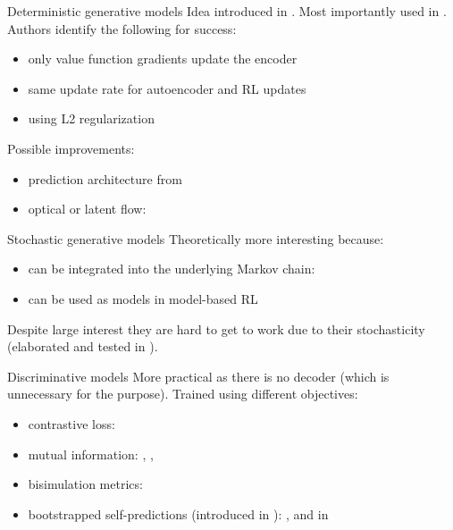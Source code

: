 \documentclass{beamer}
\begin{document}
\begin{frame}{Deterministic generative models}
	Idea introduced in \cite{lange2010deep}.
	Most importantly used in \cite{sac+ae}.
	Authors identify the following for success:
	\begin{itemize}
			\item only value function gradients update the encoder
			\item same update rate for autoencoder and RL updates
			\item using L2 regularization
	\end{itemize}
	Possible improvements:
	\begin{itemize}
			\item prediction architecture from \cite{oh2015action}
			\item optical or latent flow: \cite{flow}
	\end{itemize}
\end{frame}


\begin{frame}{Stochastic generative models}
		Theoretically more interesting because:
		\begin{itemize}
				\item can be integrated into the underlying Markov chain: \cite{slac}
				\item can be used as models in model-based RL
		\end{itemize}
		Despite large interest they are hard to get to work due to 
		their stochasticity (elaborated and tested in \cite{sac+ae}).
\end{frame}


\begin{frame}{Discriminative models}
		More practical as there is no decoder (which is unnecessary for the purpose).
		Trained using different objectives:
		\begin{itemize}
				\item contrastive loss: \cite{curl}
				\item mutual information: \cite{rakelly2021mutual}, 
						\cite{anand2019unsupervised}, \cite{mazoure2020deep}
				\item bisimulation metrics: \cite{invariantrepwithoutreconstruction}
				\item bootstrapped self-predictions (introduced in \cite{grill2020bootstrap}):
\cite{schwarzer2020data}, and in \cite{merckling2022exploratory}
		\end{itemize}
\end{frame}
\end{document}
